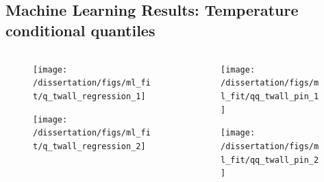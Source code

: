 \documentclass[t, pdftex]{beamer}
\begin{document}
\subsection*{Machine Learning Results: Temperature conditional quantiles}
\begin{frame}
\vspace{-33pt}
\begin{columns}
    \begin{column}{0.5\textwidth}
        \begin{figure}[H]%
            \texttt{[image: /dissertation/figs/ml\_fit/q\_twall\_regression\_1]}
        \end{figure}
        \vspace{-26pt}
        \begin{figure}[H]%
            \texttt{[image: /dissertation/figs/ml\_fit/q\_twall\_regression\_2]}
        \end{figure}
    \end{column}
    \begin{column}{0.5\textwidth}
        \begin{figure}[H]%
            \texttt{[image: /dissertation/figs/ml\_fit/qq\_twall\_pin\_1]}
        \end{figure}
        \vspace{-26pt}
        \begin{figure}[H]%
            \texttt{[image: /dissertation/figs/ml\_fit/qq\_twall\_pin\_2]}
        \end{figure}
    \end{column}
\end{columns}
\end{frame}

\end{document}
